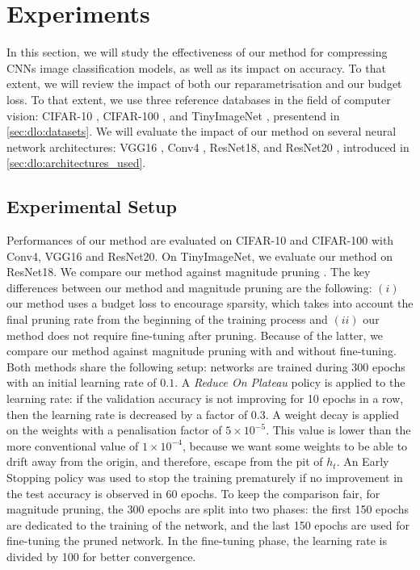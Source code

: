 
\section{Experiments}\label{sec:chap1:experiments}

In this section, we will study the effectiveness of our method for compressing
\aclp{CNN} image classification models, as well as its impact on accuracy. To
that extent, we will review the impact of both our reparametrisation and our
budget loss. To that extent, we use three reference databases in the field of
computer vision: CIFAR-10 \cite{CIFARdataset}, CIFAR-100 \cite{CIFARdataset},
and TinyImageNet \cite{TinyImageNet}, presentend in \cref{sec:dlo:datasets}.
We will evaluate the impact of our method on several neural network
architectures: VGG16 \cite{DBLP:journals/corr/SimonyanZ14a}, Conv4
\cite{DBLP:conf/iclr/FrankleC19}, ResNet18, and ResNet20
\cite{DBLP:conf/cvpr/HeZRS16}, introduced in \cref{sec:dlo:architectures_used}.\\


\subsection{Experimental Setup}\label{sec:chap1:experimental_setup}

Performances of our method are evaluated on CIFAR-10 and CIFAR-100 with Conv4,
VGG16 and ResNet20. On TinyImageNet, we evaluate our method on ResNet18. We
compare our method against magnitude pruning \cite{DBLP:conf/nips/HanPTD15}. The
key differences between our method and magnitude pruning are the following:
$(i)$ our method uses a budget loss to encourage sparsity, which takes into
account the final pruning rate from the beginning of the training process and
$(ii)$ our method does not require fine-tuning after pruning. Because of the
latter, we compare our method against magnitude pruning with and without
fine-tuning. Both methods share the following setup: networks are trained during
300 epochs with an initial learning rate of $0.1$. A \emph{Reduce On Plateau}
policy is applied to the learning rate: if the validation accuracy is not
improving for 10 epochs in a row, then the learning rate is decreased by a
factor of $0.3$. A weight decay is applied on the weights with a penalisation
factor of $5\times10^{−5}$. This value is lower than the more conventional value
of $1\times10^{-4}$, because we want some weights to be able to drift away from
the origin, and therefore, escape from the pit of $h_t$. An Early Stopping
policy was used to stop the training prematurely if no improvement in the test
accuracy is observed in 60 epochs. To keep the comparison fair, for magnitude
pruning, the 300 epochs are split into two phases: the first 150 epochs are
dedicated to the training of the network, and the last 150 epochs are used for
fine-tuning the pruned network. In the fine-tuning phase, the learning rate is
divided by 100 for better convergence. \\


